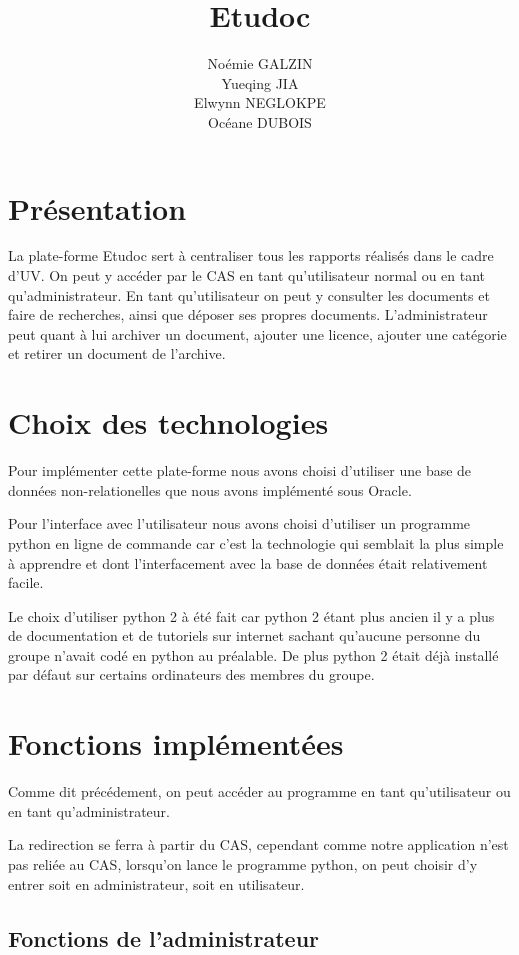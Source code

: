 \documentclass[11pt]{report}
\title{\textbf{Etudoc}}
\author{Noémie GALZIN \\
		Yueqing JIA \\
		Elwynn NEGLOKPE\\
		Océane DUBOIS}
\date{}
\begin{document}
\maketitle
\newpage
\section{Présentation}
La plate-forme Etudoc sert à centraliser tous les rapports réalisés dans le cadre d'UV. On peut y accéder par le CAS en tant qu'utilisateur normal ou en tant qu'administrateur. 
En tant qu'utilisateur on peut y consulter les documents et faire de recherches, ainsi que déposer ses propres documents. 
L'administrateur peut quant à lui archiver un document, ajouter une licence, ajouter une catégorie et retirer un document de l'archive.

\section{Choix des technologies}
Pour implémenter cette plate-forme nous avons choisi d'utiliser une base de données non-relationelles que nous avons implémenté sous Oracle. 

Pour l'interface avec l'utilisateur nous avons choisi d'utiliser un programme python en ligne de commande car c'est la technologie qui semblait la plus simple à apprendre et dont l'interfacement avec la base de données était relativement facile.

Le choix d'utiliser python 2 à été fait car python 2 étant plus ancien il y a plus de documentation et de tutoriels sur internet sachant qu'aucune personne du groupe n'avait codé en python au préalable. De plus python 2 était déjà installé par défaut sur certains ordinateurs des membres du groupe.

\section{Fonctions implémentées}

Comme dit précédement, on peut accéder au programme en tant qu'utilisateur ou en tant qu'administrateur.

La redirection se ferra à partir du CAS, cependant comme notre application n'est pas reliée au CAS, lorsqu'on lance le programme python, on peut choisir d'y entrer soit en administrateur, soit en utilisateur.

\subsection{Fonctions de l'administrateur}
\end{document}
